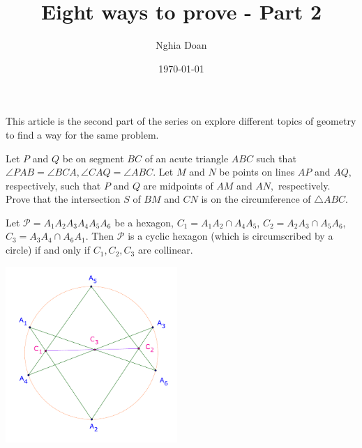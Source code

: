 \documentclass{article}
\title{Eight ways to prove - Part 2}
\author{Nghia Doan}
\date{\today}
\begin{document}
\maketitle

This article is the second part of the series on explore different topics of geometry to find a way for the same problem.

\begin{example*}
    Let $P$ and $Q$ be on segment $BC$ of an acute triangle $ABC$ such that $\angle PAB=\angle BCA, \angle CAQ=\angle ABC.$
    Let $M$ and $N$ be points on lines $AP$ and $AQ,$ respectively, such that $P$ and $Q$ are midpoints of $AM$ and $AN,$ respectively.
    Prove that the intersection $S$ of $BM$ and $CN$ is on the circumference of $\triangle ABC$.    
\end{example*}

\begin{theorem*}
    \label{theorem:pascal-theorem}
    Let $\mathcal{P}=A_1A_2A_3A_4A_5A_6$ be a hexagon,
    $C_1 = A_1A_2 \cap A_4A_5$, $C_2 = A_2A_3 \cap A_5A_6$, $C_3 = A_3A_4 \cap A_6A_1$.
    Then $\mathcal{P}$ is a cyclic hexagon (which is circumscribed by a circle)
    if and only if $C_1, C_2, C_3$ are collinear.
\end{theorem*}

\begin{center}
    \includegraphics[width=6.5cm]{./svg/pdf/pascal-theorem.pdf}
\end{center}

\newpage
\end{document}
